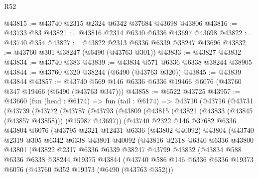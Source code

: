\begin{lexlean}{R52}
\begin{coremodule}
@43815 := @43740 @2315 @2324 @6342 @37684 @43698 @43806
@43816 := @43733 @83
@43821 := @43816 @2314 @6340 @6336 @43697 @43698
@43822 := @43740 @354
@43827 := @43822 @2313 @6336 @6339 @38247 @43696
@43832 := @43760 @301 @38247 (@6490 (@43763 @301))
@43833 := @43827 @43832
@43834 := @43740 @383
@43839 := @43834 @571 @6336 @6338 @38244 @38905
@43844 := @43760 @320 @38244 (@6490 (@43763 @320))
@43845 := @43839 @43844
@43857 := @43740 @569 @146 @6336 @6336 @19466 @6076 (@43760 @347 @19466 (@6490 (@43763 @347)))
@43858 := @6522 @43725
@43957 := @43660
    (fun (head : @6174) =>
    fun (tail : @6174) =>
    @43710
      (@43716
        (@43731
          (@43739
            (@43772
              (@43787
                (@43793
                  (@43809
                    (@43815
                      (@43821 (@43833 (@43845 (@43857 @43858))) (@15987 @43697))
                      (@43740
                        @2322
                        @146
                        @37682
                        @6336
                        @43804
                        @6076
                        (@43795
                          @2321
                          @12431
                          @6336
                          (@43802 @40092)
                          @43804
                          (@43740
                            @2319
                            @305
                            @6342
                            @6338
                            @43801
                            @40092
                            (@43816
                              @2318
                              @6340
                              @6336
                              @43800
                              @43801
                              (@43822
                                @2317
                                @6336
                                @6339
                                @38247
                                @43799
                                @43832
                                (@43834
                                  @588
                                  @6336
                                  @6338
                                  @38244
                                  @19375
                                  @43844
                                  (@43740
                                    @586
                                    @146
                                    @6336
                                    @6336
                                    @19373
                                    @6076
                                    (@43760 @352 @19373 (@6490 (@43763 @352)))

\end{coremodule}
\end{lexlean}
